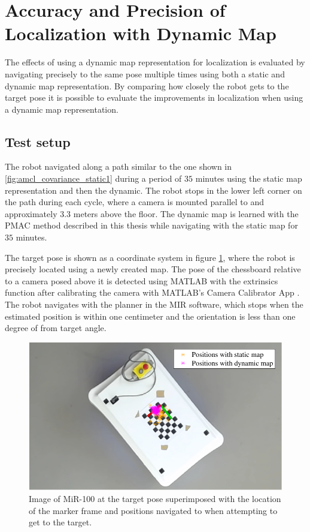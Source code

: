 \section{Accuracy and Precision of Localization with Dynamic Map}
The effects of using a dynamic map representation for localization is evaluated by navigating precisely to the same pose multiple times using both a static and dynamic map representation.
By comparing how closely the robot gets to the target pose it is possible to evaluate the improvements in localization when using a dynamic map representation. 
\subsection{Test setup} 
The robot navigated along a path similar to the one shown in \ref{fig:amcl_covariance_static1} during a period of $35$ minutes using the static map representation and then the dynamic.
The robot stops in the lower left corner on the path during each cycle, where a camera is mounted parallel to and approximately $3.3$ meters above the floor.
The dynamic map is learned with the PMAC method described in this thesis while navigating with the static map for $35$ minutes.

The target pose is shown as a coordinate system in figure \ref{fig:mir_precision_explained}, where the robot is precisely located using a newly created map.
The pose of the chessboard relative to a camera posed above it is detected using MATLAB with the extrinsics function \cite{matlab_extrinsics} after calibrating the camera with MATLAB's Camera Calibrator App  \cite{camera_calibrator_app}.
The robot navigates with the planner in the MIR software, which stops when the estimated position is within one centimeter and the orientation is less than one degree of from target angle.

\begin{figure}
    \centering
    \includegraphics[scale=1]{chapters/evaluation/figures/mir_precision_explained}
    \caption{Image of MiR-100 at the target pose superimposed with the location of the marker frame and positions navigated to when attempting to get to the target.}
    \label{fig:mir_precision_explained}
\end{figure}


